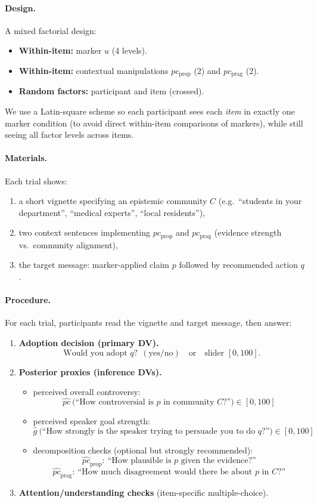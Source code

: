 \documentclass[12pt]{article}
\begin{document}
\paragraph{Design.}
A mixed factorial design:
\begin{itemize}
\item \textbf{Within-item:} marker $u$ (4 levels).
\item \textbf{Within-item:} contextual manipulations $pc_{\text{prop}}$ (2) and $pc_{\text{prag}}$ (2).
\item \textbf{Random factors:} participant and item (crossed).
\end{itemize}
We use a Latin-square scheme so each participant sees each \emph{item} in exactly one marker condition (to avoid direct within-item comparisons of markers), while still seeing all factor levels across items.

\paragraph{Materials.}
Each trial shows:
\begin{enumerate}
\item a short vignette specifying an epistemic community $C$ (e.g.\ ``students in your department'', ``medical experts'', ``local residents''),
\item two context sentences implementing $pc_{\text{prop}}$ and $pc_{\text{prag}}$ (evidence strength vs.\ community alignment),
\item the target message: marker-applied claim $p$ followed by recommended action $q$.
\end{enumerate}

\paragraph{Procedure.}
For each trial, participants read the vignette and target message, then answer:

\begin{enumerate}
\item \textbf{Adoption decision (primary DV).}
\[
\text{Would you adopt } q?\ \ (\text{yes/no}) \quad\text{or}\quad \text{slider }[0,100].
\]
\item \textbf{Posterior proxies (inference DVs).}
\begin{itemize}
\item perceived overall controversy:
\[
\widehat{pc} \ \text{(``How controversial is $p$ in community $C$?'')} \in [0,100]
\]
\item perceived speaker goal strength:
\[
\widehat{g}\ \text{(``How strongly is the speaker trying to persuade you to do $q$?'')} \in [0,100]
\]
\item decomposition checks (optional but strongly recommended):
\[
\widehat{pc}_{\text{prop}}:\ \text{``How plausible is $p$ given the evidence?''}
\]
\[
\widehat{pc}_{\text{prag}}:\ \text{``How much disagreement would there be about $p$ in $C$?''}
\]
\end{itemize}
\item \textbf{Attention/understanding checks} (item-specific multiple-choice).
\end{enumerate}
\end{document}
